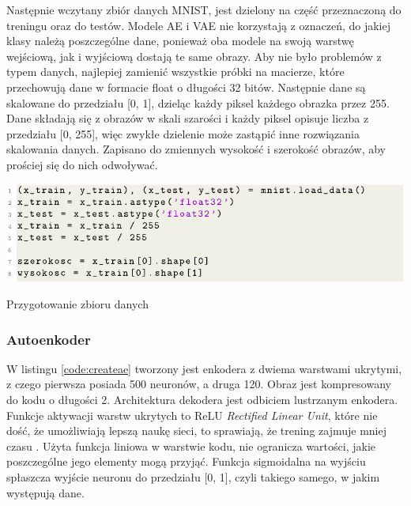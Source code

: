 \documentclass[a4paper,12pt,oneside]{book} %
\begin{document}
Następnie wczytany zbiór danych MNIST, jest dzielony na część przeznaczoną do treningu oraz do testów. Modele AE i VAE nie korzystają z oznaczeń, do jakiej klasy należą poszczególne dane, ponieważ oba modele na swoją warstwę wejściową, jak i wyjściową dostają te same obrazy. Aby nie było problemów z typem danych, najlepiej zamienić wszystkie próbki na macierze, które przechowują dane w formacie float o długości 32 bitów. Następnie dane są skalowane do przedziału [0, 1], dzieląc każdy piksel każdego obrazka przez 255. Dane składają się z obrazów w skali szarości i każdy piksel opisuje liczba z przedziału [0, 255], więc zwykłe dzielenie może zastąpić inne rozwiązania skalowania danych. Zapisano do zmiennych wysokość i szerokość obrazów, aby prościej się do nich odwoływać.
\begin{code}[h!]
	\centering
	\includegraphics[width=\linewidth]{dane.pdf}
	\caption{Przygotowanie zbioru danych}
	\label{code:dataset}
\end{code}
\subsubsection{Autoenkoder}
 W listingu \ref{code:createae} tworzony jest enkodera z dwiema warstwami ukrytymi, z czego pierwsza posiada 500 neuronów, a druga 120. Obraz jest kompresowany do kodu o długości 2. Architektura dekodera jest odbiciem lustrzanym enkodera. Funkcje aktywacji warstw ukrytych to ReLU \textit{Rectified Linear Unit}, które nie dość, że umożliwiają lepszą naukę sieci, to sprawiają, że trening zajmuje mniej czasu \cite{relu}. Użyta funkcja liniowa w warstwie kodu, nie ogranicza wartości, jakie poszczególne jego elementy mogą przyjąć. Funkcja sigmoidalna na wyjściu spłaszcza wyjście neuronu do przedziału [0, 1], czyli takiego samego, w jakim występują dane.\\
\end{document}
